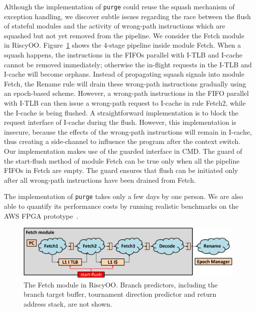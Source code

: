 \documentclass[conference]{IEEEtran}
\newcommand{\flushInst}{\texttt{purge}\xspace}
\begin{document}
Although the implementation of \flushInst{} could reuse the squash mechanism of exception handling, we discover subtle issues regarding the race between the flush of stateful modules and the activity of wrong-path instructions which are squashed but not yet removed from the pipeline.
We consider the Fetch module in RiscyOO.
Figure~\ref{fig:fetch} shows the 4-stage pipeline inside module Fetch.
When a squash happens, the instructions in the FIFOs parallel with I-TLB and I-cache cannot be removed immediately; otherwise the in-flight requests in the I-TLB and I-cache will become orphans.
Instead of propagating squash signals into module Fetch, the Rename rule will drain these wrong-path instructions gradually using an epoch-based scheme.
However, a wrong-path instructions in the FIFO parallel with I-TLB can then issue a wrong-path request to I-cache in rule Fetch2, while the I-cache is being flushed.
A straightforward implementation is to block the request interface of I-cache during the flush.
However, this implementation is insecure, because the effects of the wrong-path instructions will remain in I-cache, thus creating a side-channel to influence the program after the context switch.
Our implementation makes use of the guarded interface in CMD.
The guard of the start-flush method of module Fetch can be true only when all the pipeline FIFOs in Fetch are empty.
The guard ensures that flush can be initiated only after all wrong-path instructions have been drained from Fetch.

The implementation of \flushInst{} takes only a few days by one person.
We are also able to quantify its performance costs by running realistic benchmarks on the AWS FPGA prototype~\cite{mi6}.

\begin{figure}[!htb]
    \centering
    \includegraphics[width=\columnwidth]{figs/fetch_cropped.pdf}
    \caption{The Fetch module in RiscyOO. Branch predictors, including the branch target buffer, tournament direction predictor and return address stack, are not shown.}\label{fig:fetch}
\end{figure}
\end{document}

